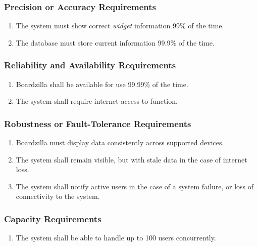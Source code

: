 \documentclass{article}
\begin{document}
	\subsubsection{Precision or Accuracy Requirements}
	\label{ssub:precision_or_accuracy_requirements}
	\begin{enumerate}[{PR}1. ]
		\item The system must show correct \textit{widget} information 99\% of the time.
		\item The database must store current information 99.9\% of the time.
	\end{enumerate}
	
	\subsubsection{Reliability and Availability Requirements}
	\label{ssub:reliability_and_availability_requirements}
	\begin{enumerate}[{PR}1. ]
		\item Boardzilla shall be available for use 99.99\% of the time.
		\item The system shall require internet access to function.
	\end{enumerate}
	
	\subsubsection{Robustness or Fault-Tolerance Requirements}
	\label{ssub:robustness_or_fault_tolerance_requirements}
	\begin{enumerate}[{PR}1.]
		\item Boardzilla must display data consistently across supported devices.
		\item The system shall remain visible, but with stale data in the case of internet loss.
		\item The system shall notify active users in the case of a system failure, or loss of connectivity to the system.
	\end{enumerate}
	
	\subsubsection{Capacity Requirements}
	\label{ssub:capacity_requirements}
	\begin{enumerate}[{PR}1. ]
		\item The system shall be able to handle up to 100 users concurrently.
	\end{enumerate}
	
\end{document}
